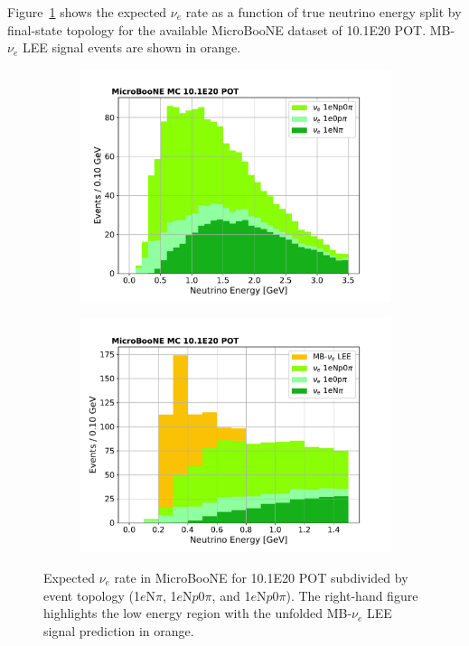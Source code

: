 \par Figure~\ref{fig:nuerate} shows the expected $\nu_e$ rate as a function of true neutrino energy split by final-state topology for the available MicroBooNE dataset of 10.1E20 POT. %
 MB-$\nu_e$ LEE signal events are shown in orange.
\begin{figure}[H] 
\begin{center}
    \begin{subfigure}[b]{0.45\textwidth}
    \centering
    \includegraphics[width=1.00\textwidth]{introduction/nue_rate_MCC9.pdf}
    \end{subfigure}
    \begin{subfigure}[b]{0.45\textwidth}
    \centering
    \includegraphics[width=1.00\textwidth]{introduction/nue_rate_MCC9_LEE.pdf}
    \end{subfigure}
\caption{\label{fig:nuerate}Expected $\nu_e$ rate in MicroBooNE for 10.1E20 POT %
 subdivided by event topology (1$e$N$\pi$, 1$e$N$p$0$\pi$, and 1$e$N$p$0$\pi$). The right-hand figure highlights the low energy region with the unfolded MB-$\nu_e$ LEE signal prediction in orange.}
\end{center}
\end{figure}

